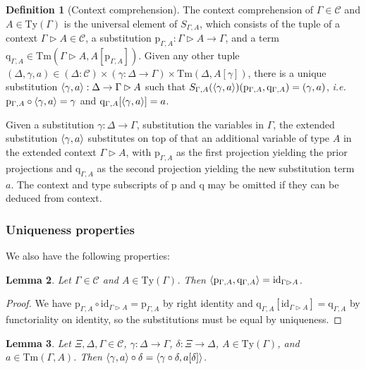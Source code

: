 \documentclass{article}
\makeatletter
\newcommand{\ie}{\textit{i.e.}\@\xspace}
\renewcommand{\_}{\textrm{\textscale{.5}{\textunderscore}}}
\DeclarePairedDelimiter{\ctxt}{\langle}{\rangle}
\newcommand{\Tm}{\mathrm{Tm}}
\newcommand{\Ty}{\mathrm{Ty}}
\newcommand{\id}{\mathrm{id}}
\newcommand{\p}{\mathrm{p}}
\newcommand{\q}{\mathrm{q}}
\newcommand{\Pair}[3]{(#1 \mathbin{:} #2) \mathrel{\times} #3}
\theoremstyle{definition}
\newtheorem{definition}{Definition}[section]
\theoremstyle{plain}
\newtheorem{lemma}[definition]{Lemma}
\makeatother
\begin{document}
\begin{definition}[Context comprehension]
The context comprehension of $\Gamma \in \mathcal{C}$ and $A \in \Ty(\Gamma)$
is the universal element of $S_{\Gamma, A}$,
which consists of the tuple of a context $\Gamma \rhd A \in \mathcal{C}$,
a substitution $\p_{\Gamma, A} : \Gamma \rhd A \to \Gamma$,
and a term $\q_{\Gamma, A} \in \Tm(\Gamma \rhd A, A[\p_{\Gamma, A}])$.
Given any other tuple $(\Delta, \gamma, a) \in \Pair{\Delta}{\mathcal{C}}{\Pair{\gamma}{\Delta \to \Gamma}{\Tm(\Delta, A[\gamma])}}$,
there is a unique substitution $\ctxt{\gamma, a} : \Delta \to \Gamma \rhd A$
such that $S_{\Gamma, A}(\ctxt{\gamma, a})(\p_{\Gamma, A}, \q_{\Gamma, A}) = (\gamma, a)$,
\ie $\p_{\Gamma, A} \circ \ctxt{\gamma, a} = \gamma$ and $\q_{\Gamma, A}[\ctxt{\gamma, a}] = a$.
\end{definition}

Given a substitution $\gamma : \Delta \to \Gamma$,
substitution the variables in $\Gamma$,
the extended substitution $\ctxt{\gamma, a}$ substitutes on top of that an additional variable of type $A$
in the extended context $\Gamma \rhd A$,
with $\p_{\Gamma, A}$ as the first projection yielding the prior projections and $\q_{\Gamma, A}$ as the second projection yielding the new substitution term $a$.
The context and type subscripts of $\p$ and $\q$ may be omitted if they can be deduced from context.

\subsubsection{Uniqueness properties}

We also have the following properties:

\begin{lemma} \label{lem:pq}
Let $\Gamma \in \mathcal{C}$ and $A \in \Ty(\Gamma)$.
Then $\ctxt{\p_{\Gamma, A}, \q_{\Gamma, A}} = \id_{\Gamma \rhd A}$.
\end{lemma}

\begin{proof}
We have $\p_{\Gamma, A} \circ \id_{\Gamma \rhd A} = \p_{\Gamma, A}$ by right identity and
$\q_{\Gamma, A}[\id_{\Gamma \rhd A}] = \q_{\Gamma, A}$ by functoriality on identity,
so the substitutions must be equal by uniqueness.
\end{proof}

\begin{lemma} \label{lem:comp-comp}
Let $\Xi, \Delta, \Gamma \in \mathcal{C}$, $\gamma : \Delta \to \Gamma$, $\delta : \Xi \to \Delta$, $A \in \Ty(\Gamma)$, and $a \in \Tm(\Gamma, A)$.
Then $\ctxt{\gamma, a} \circ \delta = \ctxt{\gamma \circ \delta, a[\delta]}$.
\end{lemma}
\end{document}
